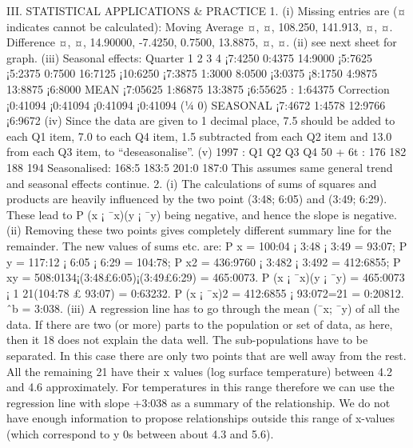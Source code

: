III. STATISTICAL APPLICATIONS & PRACTICE
1. (i) Missing entries are (¤ indicates cannot be calculated):
Moving Average ¤, ¤, 108.250, 141.913, ¤, ¤.
Difference ¤, ¤, 14.90000, -7.4250, 0.7500, 13.8875, ¤, ¤.
(ii) see next sheet for graph.
(iii) Seasonal effects:
Quarter 1 2 3 4
¡7:4250 0:4375 14:9000 ¡5:7625
¡5:2375 0:7500 16:7125 ¡10:6250
¡7:3875 1:3000 8:0500 ¡3:0375
¡8:1750 4:9875 13:8875 ¡6:8000
MEAN ¡7:05625 1:86875 13:3875 ¡6:55625 : 1:64375
Correction ¡0:41094 ¡0:41094 ¡0:41094 ¡0:41094 (¼ 0)
SEASONAL ¡7:4672 1:4578 12:9766 ¡6:9672
(iv) Since the data are given to 1 decimal place, 7.5 should be added to each Q1
item, 7.0 to each Q4 item, 1.5 subtracted from each Q2 item and 13.0 from
each Q3 item, to “deseasonalise”.
(v)
1997 : Q1 Q2 Q3 Q4
50 + 6t : 176 182 188 194
Seasonalised: 168:5 183:5 201:0 187:0
This assumes same general trend and seasonal effects continue.
2. (i) The calculations of sums of squares and products are heavily influenced by
the two point (3:48; 6:05) and (3:49; 6:29). These lead to
P
(x ¡ ¯x)(y ¡ ¯y)
being negative, and hence the slope is negative.
(ii) Removing these two points gives completely different summary line for the
remainder. The new values of sums etc. are:
P
x = 100:04 ¡ 3:48 ¡ 3:49 =
93:07;
P
y = 117:12 ¡ 6:05 ¡ 6:29 = 104:78;
P
x2 = 436:9760 ¡ 3:482 ¡
3:492 = 412:6855;
P
xy = 508:0134¡(3:48£6:05)¡(3:49£6:29) = 465:0073.
P
(x ¡ ¯x)(y ¡ ¯y) = 465:0073 ¡ 1
21(104:78 £ 93:07) = 0:63232.
P
(x ¡ ¯x)2 =
412:6855 ¡ 93:072=21 = 0:20812. ˆb = 3:038.
(iii) A regression line has to go through the mean (¯x; ¯y) of all the data. If there
are two (or more) parts to the population or set of data, as here, then it
18
does not explain the data well. The sub-populations have to be separated.
In this case there are only two points that are well away from the rest. All
the remaining 21 have their x values (log surface temperature) between 4.2
and 4.6 approximately. For temperatures in this range therefore we can use
the regression line with slope +3:038 as a summary of the relationship. We
do not have enough information to propose relationships outside this range
of x-values (which correspond to y
0s between about 4.3 and 5.6).
